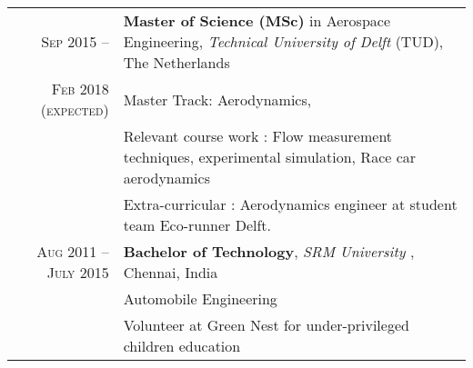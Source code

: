%
%



\begin{tabular}{rl}	
	\textsc{Sep 2015 --}  			& \textbf{Master of Science (MSc)} in Aerospace Engineering, \emph{Technical University of Delft} (TUD), The Netherlands\\
	\textsc{Feb 2018 (expected)} 	&  Master Track: Aerodynamics, \\
									&  Relevant course work : Flow measurement techniques, experimental simulation, Race car aerodynamics \\
									& Extra-curricular : Aerodynamics engineer at student team Eco-runner Delft.\\	
	\textsc{Aug 2011 --July 2015} 	&  \textbf{Bachelor of Technology},  \emph{SRM University} , Chennai, India\\
									&  Automobile Engineering \\ 
									& Volunteer at Green Nest for under-privileged children education \\ 
											
\end{tabular}